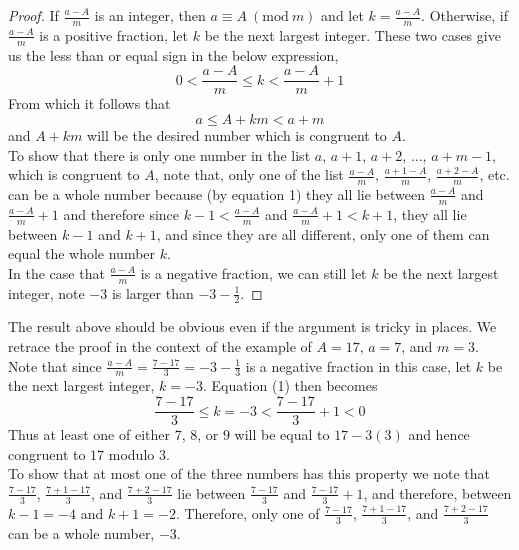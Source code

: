 \documentclass{article}
\theoremstyle{problemstyle}
\newcommand{\Mod}[1]{\ (\mathrm{mod}\ #1)}
\begin{document}
\begin{proof}
If $\frac{a - A}{m}$ is an integer, then $a \equiv A \Mod{m}$ and let $k = \frac{a - A}{m}$. Otherwise, if $\frac{a - A}{m}$ is a positive fraction, let $k$ be the next largest integer.  These two cases give us the less than or equal sign in the below expression, 
\begin{equation}0 < \frac{a - A}{m} \leq k < \frac{a - A}{m} + 1\end{equation} 
From which it follows that 
$$a \leq A+km < a+m$$ and $A+km$ will be the desired number which is congruent to $A$.\\

To show that there is only one number in the list $a$, $a+1$, $a+2$, ..., $a+m-1$, which is congruent to $A$, note that, only one of the list $\frac{a - A}{m}$, $\frac{a +1 - A}{m}$, $\frac{a + 2 - A}{m}$, etc. can be a whole number because (by equation 1) they all lie between $\frac{a - A}{m}$ and $\frac{a - A}{m}+1$ and therefore since $k-1 < \frac{a - A}{m}$ and $\frac{a - A}{m}+1 < k+1$, they all lie between $k-1$ and $k+1$, and since they are all different, only one of them can equal the whole number $k$.\\

In the case that $\frac{a - A}{m}$ is a negative fraction, we can still let $k$ be the next largest integer, note $-3$ is larger than $-3-\frac{1}{2}$. 
\end{proof}

The result above should be obvious even if the argument is tricky in places. We retrace the proof in the context of the example of $A = 17$, $a = 7$, and $m = 3$.\\ 

Note that since $\frac{a - A}{m} = \frac{7-17}{3} = -3-\frac{1}{3}$ is a negative fraction in this case, let $k$ be the next largest integer, $k = -3$. Equation (1) then becomes $$\frac{7-17}{3} \leq k=-3 < \frac{7-17}{3}+1 < 0$$ Thus at least one of either $7$, $8$, or $9$ will be equal to $17 -3(3)$ and hence congruent to $17$ modulo $3$.\\

To show that at most one of the three numbers has this property we note that $\frac{7-17}{3}$, $\frac{7+1-17}{3}$, and $\frac{7+2-17}{3}$ lie between $\frac{7-17}{3} $ and $\frac{7-17}{3}+1$, and therefore, between $k-1 = -4$ and $k+1=-2$. Therefore, only one of $\frac{7-17}{3}$, $\frac{7+1-17}{3}$, and $\frac{7+2-17}{3}$ can be a whole number, $-3$.\\
\end{document}
